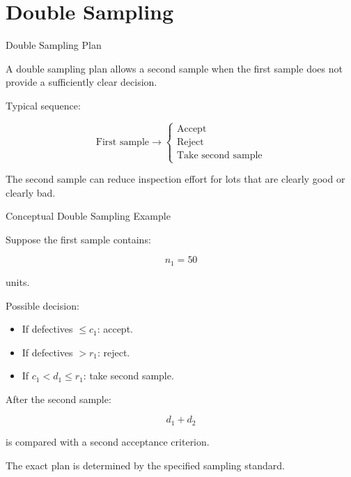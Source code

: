 \documentclass[aspectratio=169,10pt]{beamer}
\begin{document}

\section{Double Sampling}

\begin{frame}[shrink=18]{Double Sampling Plan}
\small

A double sampling plan allows a second sample when the first
sample does not provide a sufficiently clear decision.

Typical sequence:

\[
\boxed{
\text{First sample}
\rightarrow
\begin{cases}
\text{Accept}\\
\text{Reject}\\
\text{Take second sample}
\end{cases}
}
\]

The second sample can reduce inspection effort for lots that
are clearly good or clearly bad.

\end{frame}


\begin{frame}[shrink=18]{Conceptual Double Sampling Example}
\small

Suppose the first sample contains:

\[
n_1=50
\]

units.

Possible decision:

\begin{itemize}
    \item If defectives \(\le c_1\): accept.
    \item If defectives \(>r_1\): reject.
    \item If \(c_1<d_1\le r_1\): take second sample.
\end{itemize}

After the second sample:

\[
d_1+d_2
\]

is compared with a second acceptance criterion.

\vspace{5pt}

The exact plan is determined by the specified sampling standard.

\end{frame}
\end{document}
